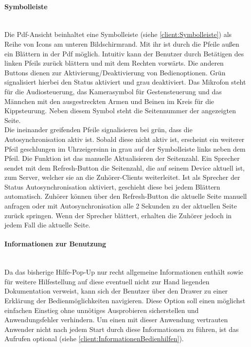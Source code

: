 \paragraph{Symbolleiste}$\;$\\
Die Pdf-Ansicht beinhaltet eine Symbolleiste (siehe \autoref{client:Symbolleiste}) als Reihe von Icons am unteren Bildschirmrand. Mit ihr ist durch die Pfeile außen ein Blättern in der Pdf möglich. Intuitiv  kann der Benutzer durch Betätigen des linken Pfeils zurück blättern und mit dem Rechten vorwärts. Die anderen Buttons dienen zur Aktivierung/Deaktivierung von Bedienoptionen. Grün signalisiert hierbei den Status aktiviert und grau deaktiviert. Das Mikrofon steht für die Audiosteuerung, das Kamerasymbol für  Gestensteuerung und das Männchen mit den ausgestreckten Armen und Beinen im Kreis für die Kippsteurung. Neben diesem Symbol steht die Seitennummer der angezeigten Seite.
\\Die ineinander greifenden Pfeile signalisieren bei grün, dass die Autosynchronisation aktiv ist. Sobald diese nicht aktiv ist, erscheint ein weiterer Pfeil geschlungen im Uhrzeigersinn in grau auf der Symbolleiste links neben dem Pfeil. Die Funktion ist das manuelle Aktualisieren der Seitenzahl. Ein Sprecher sendet mit dem Refresh-Button die Seitenzahl, die auf seinem Device aktuell ist, zum Server, welcher sie an die Zuhörer-Clients weiterleitet. Ist als Sprecher der Status Autosynchronisation aktiviert, geschieht diese bei jedem Blättern automatisch. Zuhörer können über den Refresh-Button die aktuelle Seite manuell anfragen oder mit Autosynchronisation alle 2 Sekunden zu der aktuellen Seite zurück springen. Wenn der Sprecher blättert, erhalten die Zuhörer jedoch in jedem Fall die aktuelle Seite.

\paragraph{Informationen zur Benutzung}$\;$\\
Da das bisherige Hilfe-Pop-Up nur recht allgemeine Informationen enthält sowie für weitere Hilfestellung auf diese eventuell nicht zur Hand liegenden Dokumentation verweist, kann sich der Benutzer über den Drawer zu einer Erklärung der Bedienmöglichkeiten navigieren. Diese Option soll einen möglichst einfachen Einstieg ohne unnötiges Ausprobieren sicherstellen und Anwendungsfehler verhindern. Um einen mit dieser Anwendung vertrauten Anwender nicht nach jedem Start durch diese Informationen zu führen, ist das Aufrufen optional (siehe \autoref{client:InformationenBedienhilfen}).

